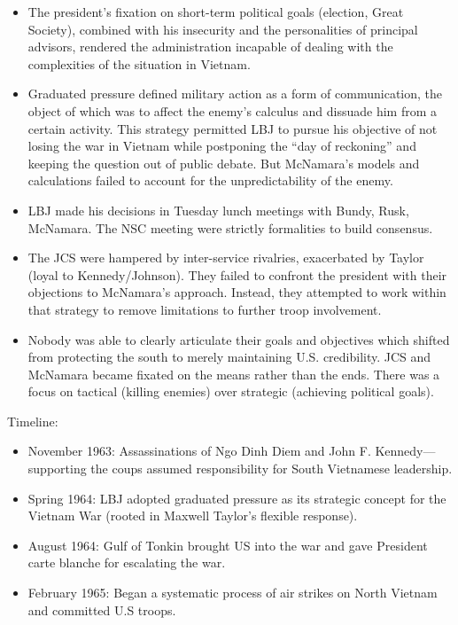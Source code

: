 \documentclass[
]{article}
\begin{document}
\begin{itemize}
\item
  The president's fixation on short-term political goals (election,
  Great Society), combined with his insecurity and the personalities of
  principal advisors, rendered the administration incapable of dealing
  with the complexities of the situation in Vietnam.
\item
  Graduated pressure defined military action as a form of communication,
  the object of which was to affect the enemy's calculus and dissuade
  him from a certain activity. This strategy permitted LBJ to pursue his
  objective of not losing the war in Vietnam while postponing the ``day
  of reckoning'' and keeping the question out of public debate. But
  McNamara's models and calculations failed to account for the
  unpredictability of the enemy.
\item
  LBJ made his decisions in Tuesday lunch meetings with Bundy, Rusk,
  McNamara. The NSC meeting were strictly formalities to build
  consensus.
\item
  The JCS were hampered by inter-service rivalries, exacerbated by
  Taylor (loyal to Kennedy/Johnson). They failed to confront the
  president with their objections to McNamara's approach. Instead, they
  attempted to work within that strategy to remove limitations to
  further troop involvement.
\item
  Nobody was able to clearly articulate their goals and objectives which
  shifted from protecting the south to merely maintaining U.S.
  credibility. JCS and McNamara became fixated on the means rather than
  the ends. There was a focus on tactical (killing enemies) over
  strategic (achieving political goals).
\end{itemize}

Timeline:

\begin{itemize}
\item
  November 1963: Assassinations of Ngo Dinh Diem and John F.
  Kennedy---supporting the coups assumed responsibility for South
  Vietnamese leadership.
\item
  Spring 1964: LBJ adopted graduated pressure as its strategic concept
  for the Vietnam War (rooted in Maxwell Taylor's flexible response).
\item
  August 1964: Gulf of Tonkin brought US into the war and gave President
  carte blanche for escalating the war.
\item
  February 1965: Began a systematic process of air strikes on North
  Vietnam and committed U.S troops.
\end{itemize}
\end{document}
